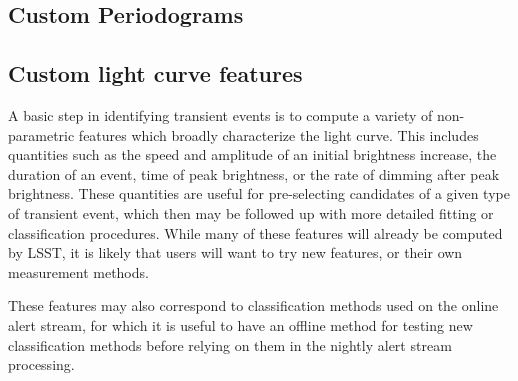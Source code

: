 \documentclass[DM,authoryear,toc]{lsstdoc}
\begin{document}
\subsection{Custom Periodograms}

\subsection{Custom light curve features}
\label{lc_features}

A basic step in identifying transient events is to compute a variety of
non-parametric features which broadly characterize the light curve. This
includes quantities such as the speed and amplitude of an initial brightness
increase, the duration of an event, time of peak brightness, or the rate of
dimming after peak brightness. These quantities are useful for pre-selecting
candidates of a given type of transient event, which then may be followed up
with more detailed fitting or classification procedures. While many of these
features will already be computed by LSST, it is likely that users will want to
try new features, or their own measurement methods.

These features may also correspond to classification methods used on the online
alert stream, for which it is useful to have an offline method for testing new
classification methods before relying on them in the nightly alert stream processing.
\end{document}
